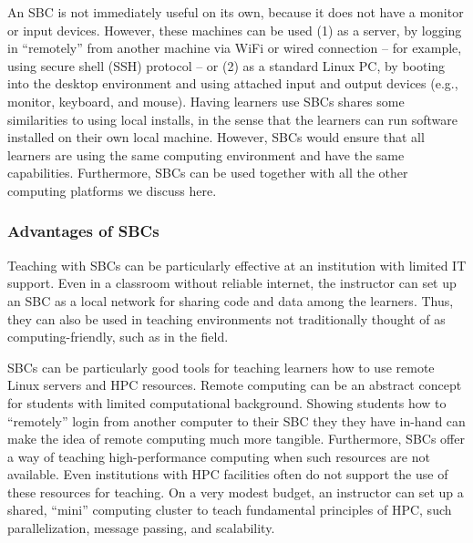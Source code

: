An SBC is not immediately useful on its own, because it does not have a monitor
or input devices.
However, these machines can be used
(1) as a server, by logging in ``remotely'' from another machine via WiFi or
wired connection -- for example, using secure shell (SSH) protocol --
or
(2) as a standard Linux PC, by booting into the desktop environment and using
attached input and output devices (e.g., monitor, keyboard, and mouse).
Having learners use SBCs shares some similarities to using local
installs, in the sense that the learners can run software installed on their
own local machine.
However, SBCs would ensure that all learners are using the same
computing environment and have the same capabilities.
Furthermore, SBCs can be used together with all the other computing platforms we
discuss here.

\subsubsection{Advantages of SBCs}

Teaching with SBCs can be particularly effective at an institution with limited
IT support.
Even in a classroom without reliable internet, the instructor can set up an SBC
as a local network for sharing code and data among the learners.
Thus, they can also be used in teaching environments not traditionally thought
of as computing-friendly, such as in the field.

SBCs can be particularly good tools for teaching learners how
to use remote Linux servers and HPC resources.
Remote computing can be an abstract concept for students with limited
computational background.
Showing students how to ``remotely'' login from another computer to their SBC
they they have in-hand can make the idea of remote computing much more
tangible.
Furthermore, SBCs offer a way of teaching high-performance
computing when such resources are not available.
Even institutions with HPC facilities often do not support the use of these
resources for teaching.
On a very modest budget, an instructor can set up a shared, ``mini''
computing cluster to teach fundamental principles of HPC, such parallelization,
message passing, and scalability.

